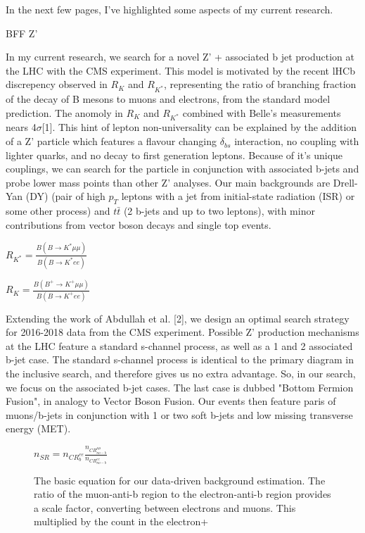 \documentclass[11pt]{article}
\begin{document}
In the next few pages, I've highlighted some aspects of my current research. 

BFF Z'

In my current research, we search for a novel Z' + associated b jet production at the LHC with the CMS experiment. This model is motivated by the recent lHCb discrepency observed in $R_K$ and $R_{K^{*}}$, representing the ratio of branching fraction of the decay of B mesons to muons and electrons, from the standard model prediction.  The anomoly in $R_K$ and $R_{K^{*}}$ combined with Belle's measurements nears 4$\sigma$[1]. This hint of lepton non-universality can be explained by the addition of a Z' particle which features a flavour changing $\delta_{bs}$ interaction, no coupling with lighter quarks, and no decay to first generation leptons. Because of it's unique couplings, we can search for the particle in conjunction with associated b-jets and probe lower mass points than other Z' analyses. Our main backgrounds are Drell-Yan (DY) (pair of high $p_T$ leptons with a jet from initial-state radiation (ISR) or some other process) and $t\bar{t}$ (2 b-jets and up to two leptons), with minor contributions from vector boson decays and single top events.  

 $R_{K^{*}} = \frac{B(B\rightarrow K^{*} \mu \mu)}{B(B\rightarrow K^{*} e e)}$
 
  $R_{K} = \frac{B(B^+\rightarrow K^+ \mu \mu)}{B(B\rightarrow K^+ e e)}$

Extending the work of Abdullah et al. [2], we design an optimal search strategy for 2016-2018 data from the CMS experiment. Possible Z' production mechanisms at the LHC feature a standard s-channel process, as well as a 1 and 2 associated b-jet case. The standard s-channel process is identical to the primary diagram in the inclusive search, and therefore gives us no extra advantage. So, in our search, we focus on the associated b-jet cases. The last case is dubbed "Bottom Fermion Fusion", in analogy to Vector Boson Fusion. Our events then feature paris of muons/b-jets in conjunction with 1 or two soft b-jets and low missing transverse energy (MET). 


\begin{figure}
    \centering
    $n_{SR}=n_{CR_{b}^{ee}}\frac{n_{CR_{no-b}^{\mu\mu}}}{n_{CR_{no-b}^{ee}}}$
    \caption{The basic equation for our data-driven background estimation. The ratio of the muon-anti-b region to the electron-anti-b region provides a scale factor, converting between electrons and muons. This multiplied by the count in the electron+}
    \label{fig:ABCD_eqn}
\end{figure}
\end{document}
